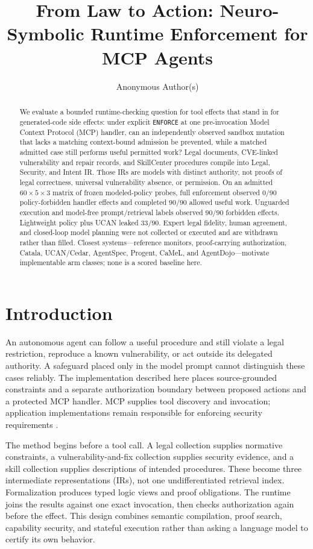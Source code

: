 \documentclass{article}
\title{From Law to Action: Neuro-Symbolic Runtime Enforcement for MCP Agents}
\author{Anonymous Author(s)}
\begin{document}
\maketitle
\begin{abstract}
We evaluate a bounded runtime-checking question for tool effects that stand in for generated-code side effects: under explicit \texttt{ENFORCE} at one pre-invocation Model Context Protocol (MCP) handler, can an independently observed sandbox mutation that lacks a matching context-bound admission be prevented, while a matched admitted case still performs useful permitted work? Legal documents, CVE-linked vulnerability and repair records, and SkillCenter procedures compile into Legal, Security, and Intent IR. Those IRs are models with distinct authority, not proofs of legal correctness, universal vulnerability absence, or permission. On an admitted $60\times 5\times 3$ matrix of frozen modeled-policy probes, full enforcement observed $0/90$ policy-forbidden handler effects and completed $90/90$ allowed useful work. Unguarded execution and model-free prompt/retrieval labels observed $90/90$ forbidden effects. Lightweight policy plus UCAN leaked $33/90$. Expert legal fidelity, human agreement, and closed-loop model planning were not collected or executed and are withdrawn rather than filled. Closest systems---reference monitors, proof-carrying authorization, Catala, UCAN/Cedar, AgentSpec, Progent, CaMeL, and AgentDojo---motivate implementable arm classes; none is a scored baseline here.
\end{abstract}

\section{Introduction}

An autonomous agent can follow a useful procedure and still violate a legal restriction, reproduce a known vulnerability, or act outside its delegated authority. A safeguard placed only in the model prompt cannot distinguish these cases reliably. The implementation described here places source-grounded constraints and a separate authorization boundary between proposed actions and a protected MCP handler. MCP supplies tool discovery and invocation; application implementations remain responsible for enforcing security requirements \citep{mcp,mcp-auth}.

The method begins before a tool call. A legal collection supplies normative constraints, a vulnerability-and-fix collection supplies security evidence, and a skill collection supplies descriptions of intended procedures. These become three intermediate representations (IRs), not one undifferentiated retrieval index. Formalization produces typed logic views and proof obligations. The runtime joins the results against one exact invocation, then checks authorization again before the effect. This design combines semantic compilation, proof search, capability security, and stateful execution rather than asking a language model to certify its own behavior.
\end{document}
